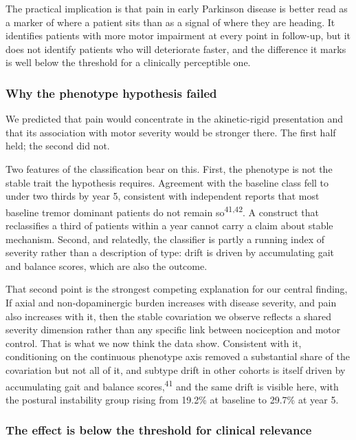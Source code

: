 \documentclass[
  english,
  12pt,
]{article}
\begin{document}
The practical implication is that pain in early Parkinson disease is better read as a marker of where a patient sits than as a signal of where they are heading. It identifies patients with more motor impairment at every point in follow-up, but it does not identify patients who will deteriorate faster, and the difference it marks is well below the threshold for a clinically perceptible one.

\subsubsection{Why the phenotype hypothesis failed}\label{why-the-phenotype-hypothesis-failed}

We predicted that pain would concentrate in the akinetic-rigid presentation and that its association with motor severity would be stronger there. The first half held; the second did not.

Two features of the classification bear on this. First, the phenotype is not the stable trait the hypothesis requires. Agreement with the baseline class fell to under two thirds by year 5, consistent with independent reports that most baseline tremor dominant patients do not remain so\textsuperscript{41,42}. A construct that reclassifies a third of patients within a year cannot carry a claim about stable mechanism. Second, and relatedly, the classifier is partly a running index of severity rather than a description of type: drift is driven by accumulating gait and balance scores, which are also the outcome.

That second point is the strongest competing explanation for our central finding, If axial and non-dopaminergic burden increases with disease severity, and pain also increases with it, then the stable covariation we observe reflects a shared severity dimension rather than any specific link between nociception and motor control. That is what we now think the data show. Consistent with it, conditioning on the continuous phenotype axis removed a substantial share of the covariation but not all of it, and subtype drift in other cohorts is itself driven by accumulating gait and balance scores,\textsuperscript{41} and the same drift is visible here, with the postural instability group rising from 19.2\% at baseline to 29.7\% at year 5.

\subsubsection{The effect is below the threshold for clinical relevance}\label{the-effect-is-below-the-threshold-for-clinical-relevance}
\end{document}
